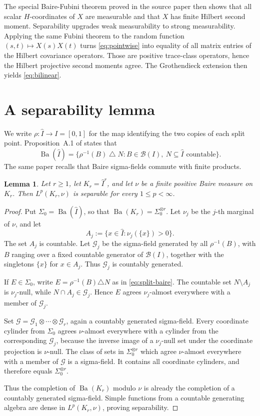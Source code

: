 \documentclass[11pt]{article}
\newtheorem{lemma}{Lemma}
\newcommand{\Ba}{\operatorname{Ba}}
\begin{document}
The special Baire-Fubini theorem proved in the source paper then shows that all
scalar $H$-coordinates of $X$ are measurable and that $X$ has finite
Hilbert second moment.  Separability upgrades weak measurability to strong
measurability.  Applying the same Fubini theorem to the random function
$(s,t)\mapsto X(s)X(t)$ turns \eqref{eq:pointwise} into equality of all
matrix entries of the Hilbert covariance operators.  Those are positive
trace-class operators, hence the Hilbert projective second moments agree.
The Grothendieck extension then yields \eqref{eq:bilinear}.

\section{A separability lemma}

We write $\rho:\widehat I\to I=[0,1]$ for the map identifying the two copies
of each split point.  Proposition~A.1 of \cite{Janson} states that
\begin{equation}\label{eq:split-baire}
 \Ba(\widehat I)=
 \{\rho^{-1}(B)\mathbin\triangle N:
       B\in\mathcal B(I),\ N\subseteq\widehat I\text{ countable}\}.
\end{equation}
The same paper recalls that Baire sigma-fields commute with finite products.

\begin{lemma}\label{lem:sep}
Let $r\ge1$, let $K_r=\widehat I^r$, and let $\nu$ be a finite
positive Baire measure on $K_r$.  Then $L^p(K_r,\nu)$ is separable for
every $1\le p<\infty$.
\end{lemma}

\begin{proof}
Put $\Sigma_0=\Ba(\widehat I)$, so that
$\Ba(K_r)=\Sigma_0^{\otimes r}$.  Let $\nu_j$ be the $j$-th marginal
of $\nu$, and let
\[
 A_j:=\{x\in\widehat I:\nu_j(\{x\})>0\}.
\]
The set $A_j$ is countable.  Let $\mathcal G_j$ be the sigma-field
generated by all $\rho^{-1}(B)$, with $B$ ranging over a fixed countable
generator of $\mathcal B(I)$, together with the singletons $\{x\}$ for
$x\in A_j$.  Thus $\mathcal G_j$ is countably generated.

If $E\in\Sigma_0$, write $E=\rho^{-1}(B)\triangle N$ as in
\eqref{eq:split-baire}.  The countable set $N\setminus A_j$ is
$\nu_j$-null, while $N\cap A_j\in\mathcal G_j$.  Hence $E$ agrees
$\nu_j$-almost everywhere with a member of $\mathcal G_j$.

Set $\mathcal G=\mathcal G_1\otimes\cdots\otimes\mathcal G_r$, again a
countably generated sigma-field.  Every coordinate cylinder from
$\Sigma_0$ agrees $\nu$-almost everywhere with a cylinder from the
corresponding $\mathcal G_j$, because the inverse image of a
$\nu_j$-null set under the coordinate projection is $\nu$-null.  The
class of sets in $\Sigma_0^{\otimes r}$ which agree $\nu$-almost
everywhere with a member of $\mathcal G$ is a sigma-field.  It contains all
coordinate cylinders, and therefore equals $\Sigma_0^{\otimes r}$.

Thus the completion of $\Ba(K_r)$ modulo $\nu$ is already the completion
of a countably generated sigma-field.  Simple functions from a countable
generating algebra are dense in $L^p(K_r,\nu)$, proving separability.
\end{proof}
\end{document}

